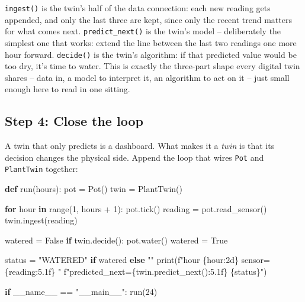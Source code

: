 \documentclass[
  12pt,
  a4paper,
]{article}
\newenvironment{Shaded}{}{}
\newcommand{\BuiltInTok}[1]{\textcolor[rgb]{0.00,0.50,0.00}{#1}}
\newcommand{\ControlFlowTok}[1]{\textcolor[rgb]{0.00,0.44,0.13}{\textbf{#1}}}
\newcommand{\DecValTok}[1]{\textcolor[rgb]{0.25,0.63,0.44}{#1}}
\newcommand{\KeywordTok}[1]{\textcolor[rgb]{0.00,0.44,0.13}{\textbf{#1}}}
\newcommand{\NormalTok}[1]{#1}
\newcommand{\OperatorTok}[1]{\textcolor[rgb]{0.40,0.40,0.40}{#1}}
\newcommand{\SpecialCharTok}[1]{\textcolor[rgb]{0.25,0.44,0.63}{#1}}
\newcommand{\SpecialStringTok}[1]{\textcolor[rgb]{0.73,0.40,0.53}{#1}}
\newcommand{\StringTok}[1]{\textcolor[rgb]{0.25,0.44,0.63}{#1}}
\newcommand{\VariableTok}[1]{\textcolor[rgb]{0.10,0.09,0.49}{#1}}
\begin{document}
\texttt{ingest()} is the twin's half of the data connection: each new
reading gets appended, and only the last three are kept, since only the
recent trend matters for what comes next.
\texttt{predict\_}\texttt{next()} is the twin's model --
deliberately the simplest one that works: extend the line between the
last two readings one more hour forward. \texttt{decide()} is the twin's
algorithm: if that predicted value would be too dry, it's time to water.
This is exactly the three-part shape every digital twin shares -- data
in, a model to interpret it, an algorithm to act on it -- just small
enough here to read in one sitting.

\subsection{Step 4: Close the loop}\label{step-4-close-the-loop}

A twin that only predicts is a dashboard. What makes it a \emph{twin} is
that its decision changes the physical side. Append the loop that wires
\texttt{Pot} and \texttt{PlantTwin} together:

\begin{Shaded}
\begin{Highlighting}[]


\KeywordTok{def}\NormalTok{ run(hours):}
\NormalTok{    pot }\OperatorTok{=}\NormalTok{ Pot()}
\NormalTok{    twin }\OperatorTok{=}\NormalTok{ PlantTwin()}

    \ControlFlowTok{for}\NormalTok{ hour }\KeywordTok{in} \BuiltInTok{range}\NormalTok{(}\DecValTok{1}\NormalTok{, hours }\OperatorTok{+} \DecValTok{1}\NormalTok{):}
\NormalTok{        pot.tick()}
\NormalTok{        reading }\OperatorTok{=}\NormalTok{ pot.read\_sensor()}
\NormalTok{        twin.ingest(reading)}

\NormalTok{        watered }\OperatorTok{=} \VariableTok{False}
        \ControlFlowTok{if}\NormalTok{ twin.decide():}
\NormalTok{            pot.water()}
\NormalTok{            watered }\OperatorTok{=} \VariableTok{True}

\NormalTok{        status }\OperatorTok{=} \StringTok{"WATERED"} \ControlFlowTok{if}\NormalTok{ watered }\ControlFlowTok{else} \StringTok{""}
        \BuiltInTok{print}\NormalTok{(}\SpecialStringTok{f"hour }\SpecialCharTok{\{}\NormalTok{hour}\SpecialCharTok{:2d\}}\SpecialStringTok{  sensor=}\SpecialCharTok{\{}\NormalTok{reading}\SpecialCharTok{:5.1f\}}\SpecialStringTok{  "}
              \SpecialStringTok{f"predicted\_next=}\SpecialCharTok{\{}\NormalTok{twin}\SpecialCharTok{.}\NormalTok{predict\_next()}\SpecialCharTok{:5.1f\}}\SpecialStringTok{  }\SpecialCharTok{\{}\NormalTok{status}\SpecialCharTok{\}}\SpecialStringTok{"}\NormalTok{)}


\ControlFlowTok{if} \VariableTok{\_\_name\_\_} \OperatorTok{==} \StringTok{"\_\_main\_\_"}\NormalTok{:}
\NormalTok{    run(}\DecValTok{24}\NormalTok{)}
\end{Highlighting}
\end{Shaded}
\end{document}
